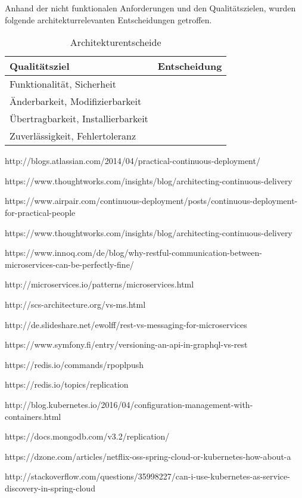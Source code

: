 Anhand der nicht funktionalen Anforderungen und den Qualitätszielen, wurden folgende architekturrelevanten Entscheidungen getroffen.

\begin{table}[H]
	\centering
	\caption{Architekturentscheide}
	\begin{tabular}{ | p{4cm} | p{12cm} | }
		\toprule
		{\textbf{Qualitätsziel}} & {\textbf{Entscheidung}} \\
		\midrule
		Funktionalität, Sicherheit &  \\ \hline
		Änderbarkeit, Modifizierbarkeit &  \\ \hline
		Übertragbarkeit, Installierbarkeit &  \\ \hline
		Zuverlässigkeit, Fehlertoleranz &  \\
		\bottomrule
	\end{tabular}
\end{table}

http://blogs.atlassian.com/2014/04/practical-continuous-deployment/

https://www.thoughtworks.com/insights/blog/architecting-continuous-delivery

https://www.airpair.com/continuous-deployment/posts/continuous-deployment-for-practical-people

https://www.thoughtworks.com/insights/blog/architecting-continuous-delivery

https://www.innoq.com/de/blog/why-restful-communication-between-microservices-can-be-perfectly-fine/

http://microservices.io/patterns/microservices.html

http://scs-architecture.org/vs-ms.html

http://de.slideshare.net/ewolff/rest-vs-messaging-for-microservices

https://www.symfony.fi/entry/versioning-an-api-in-graphql-vs-rest

https://redis.io/commands/rpoplpush

https://redis.io/topics/replication

http://blog.kubernetes.io/2016/04/configuration-management-with-containers.html

https://docs.mongodb.com/v3.2/replication/

https://dzone.com/articles/netflix-oss-spring-cloud-or-kubernetes-how-about-a

http://stackoverflow.com/questions/35998227/can-i-use-kubernetes-as-service-discovery-in-spring-cloud

